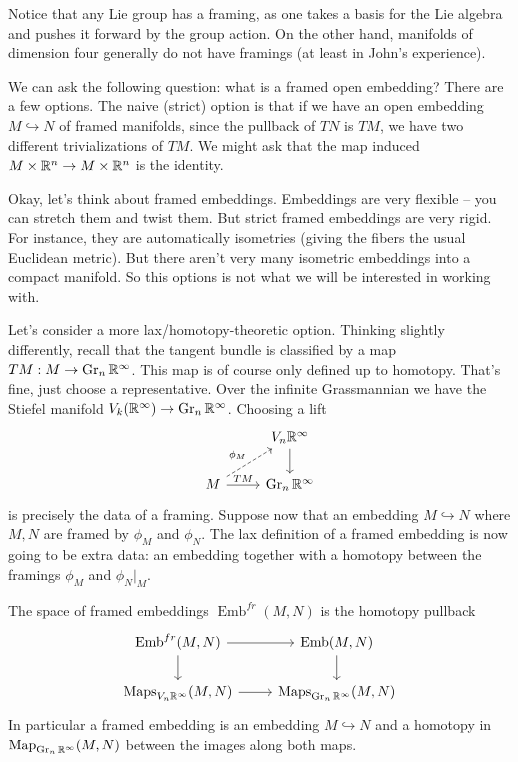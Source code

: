 \documentclass{amsart}
\DeclareMathOperator{\Emb}{Emb}
\begin{document}
Notice that any Lie group has a framing, as one takes a basis for the Lie algebra
and pushes it forward by the group action. On the other hand, manifolds of dimension
four generally do not have framings (at least in John's experience).

We can ask the following question: what is a framed open embedding? There are a few options.
The naive (strict) option is that if we have an open embedding $M\hookrightarrow N$ of
framed manifolds, since the pullback of $TN$ is $TM$, we have two different trivializations
of $TM$. We might ask that the map induced $M\times\mathbb{R}^n\to M\times\mathbb{R}^n$ is the identity.

Okay, let's think about framed embeddings. Embeddings are very flexible -- you can stretch
them and twist them. But strict framed embeddings are very rigid. For instance, they are
automatically isometries (giving the fibers the usual Euclidean metric). But there aren't
very many isometric embeddings into a compact manifold. So this options is not what we
will be interested in working with.

Let's consider a more lax/homotopy-theoretic option. Thinking slightly differently, recall
that the tangent bundle is classified by a map $TM: M\to \operatorname{Gr}_n\mathbb{R}^\infty$. This map is
of course only defined up to homotopy. That's fine, just choose a representative. Over
the infinite Grassmannian we have the Stiefel manifold $V_k(\mathbb{R}^\infty)\to\operatorname{Gr}_n\mathbb{R}^\infty$.
Choosing a lift
\begin{equation*}
    \begin{tikzcd}
        \; & V_n\R^\infty \dar \\
        M \rar{TM}\urar[dashed]{\phi_M} & \Gr_n\R^\infty
    \end{tikzcd}
\end{equation*}
is precisely the data of a framing. Suppose now that an embedding $M\hookrightarrow N$
where $M,N$ are framed by $\phi_M$ and $\phi_N$.
The lax definition of a framed embedding is now going to be extra data: an embedding
together with a homotopy between the framings $\phi_M$ and $\phi_N|_M$.


\begin{definition}
    The space of framed embeddings $\Emb^{fr}(M,N)$ is the homotopy pullback
    \begin{equation*}
        \begin{tikzcd}
            \Emb^{fr}(M,N) \rar\dar & \Emb(M,N)\dar  \\
            \Maps_{V_n\R^\infty}(M,N) \rar & \Maps_{\Gr_n\R^\infty}(M,N)
        \end{tikzcd}
    \end{equation*}
    In particular a framed embedding is an embedding $M\hookrightarrow N$ and
    a homotopy in $\operatorname*{Map}_{\operatorname{Gr}_n\mathbb{R}^\infty}(M,N)$ between the images along both maps.
\end{definition}
\end{document}

